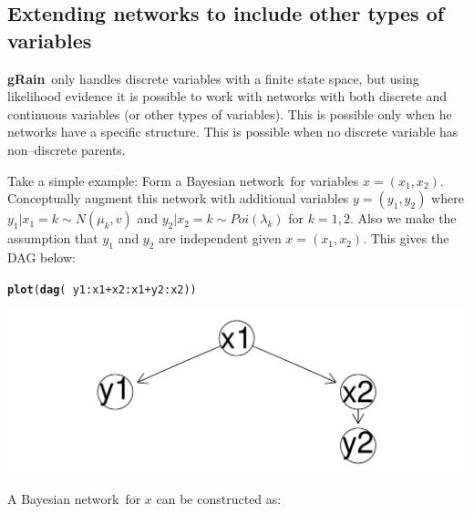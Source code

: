 \documentclass[10pt]{article}\usepackage[]{graphicx}\usepackage[]{xcolor}
\makeatletter
\def\maxwidth{ %
  \ifdim\Gin@nat@width>\linewidth
    \linewidth
  \else
    \Gin@nat@width
  \fi
}
\newcommand{\hlopt}[1]{\textcolor[rgb]{0,0,0}{#1}}%
\newcommand{\hlstd}[1]{\textcolor[rgb]{0.345,0.345,0.345}{#1}}%
\newcommand{\hlkwd}[1]{\textcolor[rgb]{0.737,0.353,0.396}{\textbf{#1}}}%
\newenvironment{kframe}{%
 \def\at@end@of@kframe{}%
 \ifinner\ifhmode%
  \def\at@end@of@kframe{\end{minipage}}%
  \begin{minipage}{\columnwidth}%
 \fi\fi%
 \def\FrameCommand##1{\hskip\@totalleftmargin \hskip-\fboxsep
 \colorbox{shadecolor}{##1}\hskip-\fboxsep
     \hskip-\linewidth \hskip-\@totalleftmargin \hskip\columnwidth}%
 \MakeFramed {\advance\hsize-\width
   \@totalleftmargin\z@ \linewidth\hsize
   \@setminipage}}%
 {\par\unskip\endMakeFramed%
 \at@end@of@kframe}
\newenvironment{knitrout}{}{} %
\def\grbn{{\bf gRain}}
\def\bn{Bayesian network}
\makeatother
\begin{document}
\subsection{Extending networks to include other types of variables}
\label{sec:ixture}

\grbn\ only handles discrete variables with a finite state space, but
using likelihood evidence it is possible to work with networks with
both discrete and continuous variables (or other types of variables).
This is possible only when he networks have a specific structure. This
is possible when no discrete variable has non--discrete parents.

Take a simple example: Form a \bn\ for variables $x=(x_1, x_2)$. 
Conceptually augment this network with additional variables $y=(y_1, y_2)$ where
$y_1|x_1=k \sim N(\mu_k, v)$ and
$y_2|x_2=k \sim Poi(\lambda_k)$ for $k=1,2$. Also we make the assumption
that $y_1$ and $y_2$ are independent given $x=(x_1, x_2)$. This gives the DAG
below:

\begin{knitrout}
\color{fgcolor}\begin{kframe}
\begin{alltt}
\hlkwd{plot}\hlstd{(}\hlkwd{dag}\hlstd{(}\hlopt{~}\hlstd{y1}\hlopt{:}\hlstd{x1} \hlopt{+} \hlstd{x2}\hlopt{:}\hlstd{x1} \hlopt{+} \hlstd{y2}\hlopt{:}\hlstd{x2))}
\end{alltt}
\end{kframe}
\includegraphics[width=\maxwidth]{figures/grain-unnamed-chunk-35-1} 
\end{knitrout}


A \bn\ for $x$ can be constructed as:
\end{document}
